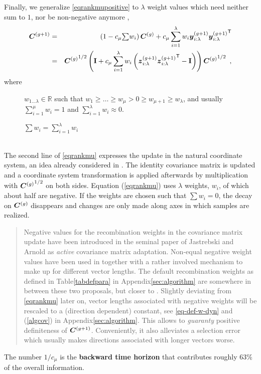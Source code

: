 \documentclass{article} %
\newenvironment{einschub}{%
\begin{small} \begin{quotation}\noindent}{%
  \vspace{0.5ex}\end{quotation}\end{small}%
}
\newcommand{\R}{\mathbb{R}}
\newcommand{\kom}[1]{}
\newcommand{\where}[1]{%
  \begin{description}
  \item[]#1 \vspace{-0.9ex}
  \end{description}
}
\newcommand{\whereende}{\vspace{2ex}~\\}
\newcommand{\ve}[1]{\mathchoice{\mbox{\boldmath$\displaystyle#1$}}
  {\mbox{\boldmath$\textstyle#1$}} {\mbox{\boldmath$\scriptstyle#1$}}
  {\mbox{\boldmath$\scriptscriptstyle#1$}}}
\newcommand{\ma}[1]{\mathchoice{\mbox{\boldmath$\displaystyle#1$}}
  {\mbox{\boldmath$\textstyle#1$}} {\mbox{\boldmath$\scriptstyle#1$}}
  {\mbox{\boldmath$\scriptscriptstyle#1$}}}
\newcommand{\T}{\ensuremath{\mathsf{T}}}
\newcommand{\auge}[1]{\textbf{#1}}
\newcommand{\sumw}[1][j]{\ensuremath{{\textstyle\sum{\!w_{#1}}}}}
\newcommand{\summ}[2]{\sum_{#1=1}^{#2}}
\newcommand{\lam}{\ensuremath{\lambda}}
\newcommand{\sig}{\ensuremath{\sigma}}
\newcommand{\Cg}{\ensuremath{\ma{C}^{(g)}}}
\newcommand{\Cgg}{\ma{C}^{(g+1)}}
\newcommand{\y}{\ve{y}}
\newcommand{\z}{\ve{z}}
\newcommand{\ygg}{\y^{(g+1)}}
\newcommand{\zgg}{\z^{(g+1)}}
\newcommand{\ilam}{{i:\lam}}
\newcommand{\Id}{\mathbf{I}}
\newcommand{\cmu}{\ensuremath{c_\mu}}
\renewcommand{\whereende}{\vspace{1ex}~\\}
\newcommand{\nref}[1]{\nolinebreak[4]\hspace{0.2845em plus0.05em minus0.17em}\nolinebreak[4]\ref{#1}}
\newcommand{\eqrefadd}[1]{(\ref{#1})} %
\newcommand{\Eqref}[1]{Equation (\ref{#1})}
\begin{document}
Finally, we generalize \eqref{eqrankmupositive} to $\lambda$ weight values which need neither sum to $1$, nor be non-negative anymore \cite{jastrebski2006improving, hansen2010benchmarking}, 
\begin{eqnarray}\label{}
    \Cgg &=& \left(1-\cmu\sumw[i]\right)\Cg + \cmu\summ{i}{\lam}w_i
            \ygg_\ilam {\ygg_\ilam}^\T \label{eqrankmu} \\
       &=& {\Cg}^{1/2} \left( \Id + \cmu \summ{i}{\lam}w_i
            \left(\zgg_\ilam {\zgg_\ilam}^\T - \Id\right)\right) {\Cg}^{1/2}
  \enspace,\nonumber  
\end{eqnarray}
%
where
%
\where{$w_{1\dots\lam}\in\R$ such that $w_1\ge\dots\ge w_\mu> 0 \ge w_{\mu+1} \ge w_\lam$, and usually $\summ{i}{\mu} w_i = 1$ and $\summ{i}{\lam} w_i \approx 0$.
}
%
\where{$\sumw[i]=\summ{i}{\lam}w_i$}
\whereende
%
The second line of \eqref{eqrankmu} expresses the update in the natural coordinate system, an idea already considered in \cite{glasmachers2010exponential}. The identity covariance matrix is updated and a coordinate system transformation is applied afterwards by multiplication with ${\Cg}^{1/2}$ on both sides.
\Eqref{eqrankmu} uses $\lam$ weights, $w_i$, of which about half are negative. If the weights are chosen such that $\sumw[i] = 0$, the decay on $\Cg$ disappears and changes are only made along axes in which samples are realized. 
%
\begin{einschub}%
Negative values for the recombination weights in the covariance matrix update have been introduced in the seminal paper of Jastrebski and Arnold \cite{jastrebski2006improving} as \emph{active} covariance matrix adaptation. Non-equal negative weight values have been used in \cite{hansen2010benchmarking} together with a rather involved mechanism to make up for different vector lengths. The default recombination weights as defined in Table\nref{tabdefpara} in Appendix\nref{sec:algorithm} are somewhere in between these two proposals, but closer to \cite{jastrebski2006improving}. Slightly deviating from \eqref{eqrankmu} later on, vector lengths associated with negative weights will be rescaled to a (direction dependent) constant, see \eqref{eq-def-w-dyn} and \eqrefadd{algcov} in Appendix\nref{sec:algorithm}. This allows to \emph{guaranty} positive definiteness of $\Cgg$. Conveniently, it also alleviates a selection error which usually makes directions associated with longer vectors worse. 
\end{einschub}
%
The number ${1}/{\cmu}$ is the \auge{backward time horizon}
that contributes roughly $63\%$ of the overall information.\kom{ that is, $\Cgg$
  is a weighted mean of{ the $g+2$ matrices} $\ma{C}^{(0)}$,
  $\frac{1}{{\sig^{(0)}}^2}\ma{C}^{(1)}_\mu$,
  $\frac{1}{{\sig^{(1)}}^2}\ma{C}^{(2)}_\mu,\dots,$
  $\frac{1}{{\sig^{(g)}}^2}\Cgg_\mu$.}%
\end{document}
